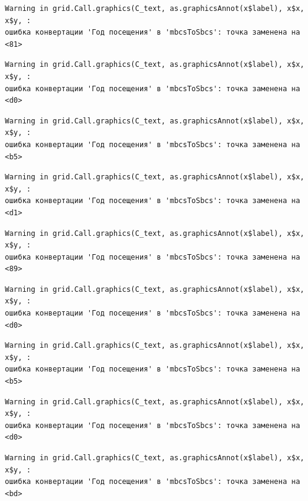 \documentclass[
  letterpaper,
  DIV=11,
  numbers=noendperiod]{scrreprt}
\begin{document}
\begin{verbatim}
Warning in grid.Call.graphics(C_text, as.graphicsAnnot(x$label), x$x, x$y, :
ошибка конвертации 'Год посещения' в 'mbcsToSbcs': точка заменена на <81>
\end{verbatim}

\begin{verbatim}
Warning in grid.Call.graphics(C_text, as.graphicsAnnot(x$label), x$x, x$y, :
ошибка конвертации 'Год посещения' в 'mbcsToSbcs': точка заменена на <d0>
\end{verbatim}

\begin{verbatim}
Warning in grid.Call.graphics(C_text, as.graphicsAnnot(x$label), x$x, x$y, :
ошибка конвертации 'Год посещения' в 'mbcsToSbcs': точка заменена на <b5>
\end{verbatim}

\begin{verbatim}
Warning in grid.Call.graphics(C_text, as.graphicsAnnot(x$label), x$x, x$y, :
ошибка конвертации 'Год посещения' в 'mbcsToSbcs': точка заменена на <d1>
\end{verbatim}

\begin{verbatim}
Warning in grid.Call.graphics(C_text, as.graphicsAnnot(x$label), x$x, x$y, :
ошибка конвертации 'Год посещения' в 'mbcsToSbcs': точка заменена на <89>
\end{verbatim}

\begin{verbatim}
Warning in grid.Call.graphics(C_text, as.graphicsAnnot(x$label), x$x, x$y, :
ошибка конвертации 'Год посещения' в 'mbcsToSbcs': точка заменена на <d0>
\end{verbatim}

\begin{verbatim}
Warning in grid.Call.graphics(C_text, as.graphicsAnnot(x$label), x$x, x$y, :
ошибка конвертации 'Год посещения' в 'mbcsToSbcs': точка заменена на <b5>
\end{verbatim}

\begin{verbatim}
Warning in grid.Call.graphics(C_text, as.graphicsAnnot(x$label), x$x, x$y, :
ошибка конвертации 'Год посещения' в 'mbcsToSbcs': точка заменена на <d0>
\end{verbatim}

\begin{verbatim}
Warning in grid.Call.graphics(C_text, as.graphicsAnnot(x$label), x$x, x$y, :
ошибка конвертации 'Год посещения' в 'mbcsToSbcs': точка заменена на <bd>
\end{verbatim}
\end{document}
